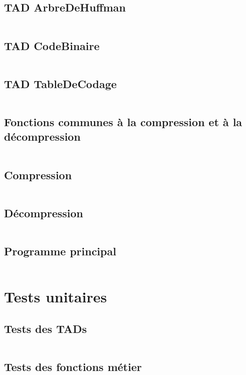 \documentclass[10pt]{report}
\begin{document}
            \subsection{TAD ArbreDeHuffman}
                \inputminted[breaklines]{c}{../src/arbreDeHuffman.c}
            \subsection{TAD CodeBinaire}
                \inputminted[breaklines]{c}{../src/codeBinaire.c}
            \subsection{TAD TableDeCodage}
                \inputminted[breaklines]{c}{../src/tableDeCodage.c}
            \subsection{Fonctions communes à la compression et à la décompression}
                \inputminted[breaklines]{c}{../src/construireArbreDeHuffman.c}
            \subsection{Compression}
                \inputminted[breaklines]{c}{../src/compression.c}
            \subsection{Décompression}
                \inputminted[breaklines]{c}{../src/decompression.c} 
            \subsection{Programme principal}
                \inputminted[breaklines]{c}{../src/main.c}
        \section{Tests unitaires}
            \subsection{Tests des TADs}
                \inputminted[breaklines]{c}{../src/testsTADs.c}
            \subsection{Tests des fonctions métier}
                \inputminted[breaklines]{c}{../src/testsFonctionsMetier.c}
\end{document}
